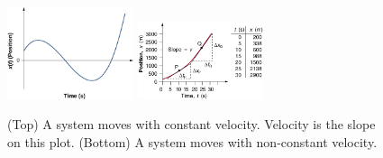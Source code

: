 \documentclass{article}
\begin{document}
\begin{figure}
\centering
\includegraphics[width=0.33\textwidth]{figures/x_vs_t.jpeg} \hspace{1cm}
\includegraphics[width=0.33\textwidth]{figures/slope2.jpeg}
\caption{\label{fig:1} (Top) A system moves with constant velocity.  Velocity is the slope on this plot. (Bottom) A system moves with non-constant velocity.}
\end{figure}
\end{document}
